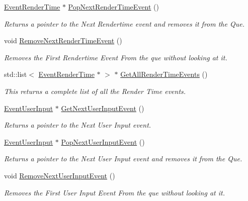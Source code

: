\begin{DoxyCompactItemize}
\hyperlink{classphys_1_1EventRenderTime}{EventRenderTime} $\ast$ \hyperlink{classphys_1_1EventManager_aa7e800d34ad8b9295ac87dfa822a2a03}{PopNextRenderTimeEvent} ()
\begin{DoxyCompactList}\small\item\em Returns a pointer to the Next Rendertime event and removes it from the Que. \item\end{DoxyCompactList}\item 
void \hyperlink{classphys_1_1EventManager_af1204912be3554312e66d3a777c1f99b}{RemoveNextRenderTimeEvent} ()
\begin{DoxyCompactList}\small\item\em Removes the First Rendertime Event From the que without looking at it. \item\end{DoxyCompactList}\item 
std::list$<$ \hyperlink{classphys_1_1EventRenderTime}{EventRenderTime} $\ast$ $>$ $\ast$ \hyperlink{classphys_1_1EventManager_aee73dff2d113826b8c01db7f7417d527}{GetAllRenderTimeEvents} ()
\begin{DoxyCompactList}\small\item\em This returns a complete list of all the Render Time events. \item\end{DoxyCompactList}\item 
\hyperlink{classphys_1_1EventUserInput}{EventUserInput} $\ast$ \hyperlink{classphys_1_1EventManager_a38b42602a3a4d621048c78b525b4db49}{GetNextUserInputEvent} ()
\begin{DoxyCompactList}\small\item\em Returns a pointer to the Next User Input event. \item\end{DoxyCompactList}\item 
\hyperlink{classphys_1_1EventUserInput}{EventUserInput} $\ast$ \hyperlink{classphys_1_1EventManager_afa89317d4b16c2b7065b9f79a4354654}{PopNextUserInputEvent} ()
\begin{DoxyCompactList}\small\item\em Returns a pointer to the Next User Input event and removes it from the Que. \item\end{DoxyCompactList}\item 
void \hyperlink{classphys_1_1EventManager_add41b5f4d2942461bcaf40a97ad40b09}{RemoveNextUserInputEvent} ()
\begin{DoxyCompactList}\small\item\em Removes the First User Input Event From the que without looking at it. \item\end{DoxyCompactList}\item 

\end{DoxyCompactItemize}
